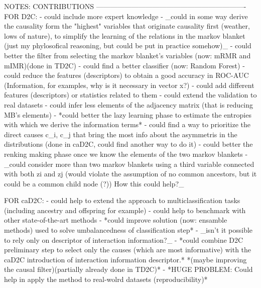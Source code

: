 NOTES: 
CONTRIBUTIONS ----------------------------------------------------------------
FOR D2C:
- could include more expert knowledge         
- _could in some way derive the causality form the "highest" variables that originate causality first (weather, lows of nature), 
  to simplify the learning of the relations in the markov blanket (just my phylosofical reasoning, but could be put in practice somehow)_
- could better the filter from selecting the markov blanket's variables (now: mRMR and mIMR)(done in TD2C)
- could find a better classifier (now: Random Forest)
- could reduce the features (descriptors) to obtain a good accuracy in ROC-AUC (Information, for examples, why is it necessary in vector x?)
- could add different features (descriptors) or statistics related to them
- could extend the validation to real datasets
- could infer less elements of the adjacency matrix (that is reducing MB's elements)
- *could better the lazy learning phase to estimate the entropies with which we derive the information terms*
- could find a way to prioritize the direct causes c_i, c_j that bring the most info about the asymmetris in the distributions 
  (done in caD2C, could find another way to do it)
- could better the renking making phase once we know the elements of the two markov blankets
- _could consider more than two markov blankets using a third variable connected with both zi and zj (would violate the assumption of no common ancestors, 
  but it could be a common child node (?)) How this could help?_

FOR caD2C:
- could help to extend the approach to multiclassification tasks (including ancestry and offspring for example)
- could help to benchmark with other state-of-the-art methods
- *could improve solution (now: ensamble methods) used to solve umbalancedness of classification step*
- _isn't it possible to rely only on descriptor of interaction information?_
- *could combine D2C preliminary step to select only the causes (which are most informative) with the caD2C introduction of interaction information descriptor.*
  *(maybe improving the causal filter)(partially already done in TD2C)*
- *HUGE PROBLEM: Could help in apply the method to real-wolrd datasets (reproducibility)*

